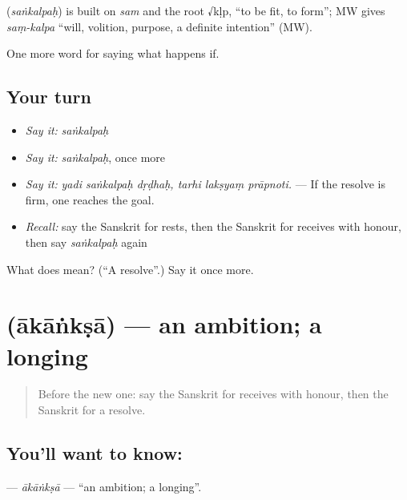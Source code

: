 \begin{cousinweb}
\textbf{} (\emph{saṅkalpaḥ}) is built on \emph{sam} and the root √kḷp, \textquotedblleft{}to be fit, to form\textquotedblright{}; MW gives \emph{saṃ-kalpa} \textquotedblleft{}will, volition, purpose, a definite intention\textquotedblright{} (MW).
\end{cousinweb}

\begin{grammarlens}[title={What you've built}]
One more word for saying what happens if.
\end{grammarlens}

\subsection*{Your turn}
\begin{itemize}
\raggedright
  \item \emph{Say it:} \emph{saṅkalpaḥ}
  \item \emph{Say it:} \emph{saṅkalpaḥ}, once more
  \item \emph{Say it:} \emph{yadi saṅkalpaḥ dṛḍhaḥ, tarhi lakṣyaṃ prāpnoti.} — If the resolve is firm, one reaches the goal.
  \item \emph{Recall:} say the Sanskrit for rests, then the Sanskrit for receives with honour, then say \emph{saṅkalpaḥ} again
\end{itemize}

\begin{tcolorbox}[breakable,colback=teal!4,colframe=teal!35!black,title={Before you move on}]
What does  mean? (\textquotedblleft{}A resolve\textquotedblright{}.) Say it once more.
\end{tcolorbox}
\section[\texorpdfstring{\sk{आकांक्षा} (ākāṅkṣā)}{आकांक्षा (ākāṅkṣā)}]{ (ākāṅkṣā) — an ambition; a longing}

\label{lesson:SA-C383-akanksa}



\begin{quote}
Before the new one: say the Sanskrit for receives with honour, then the Sanskrit for a resolve.
\end{quote}

\subsection*{You'll want to know: }
\textbf{} — \emph{ākāṅkṣā} — \textquotedblleft{}an ambition; a longing\textquotedblright{}.

